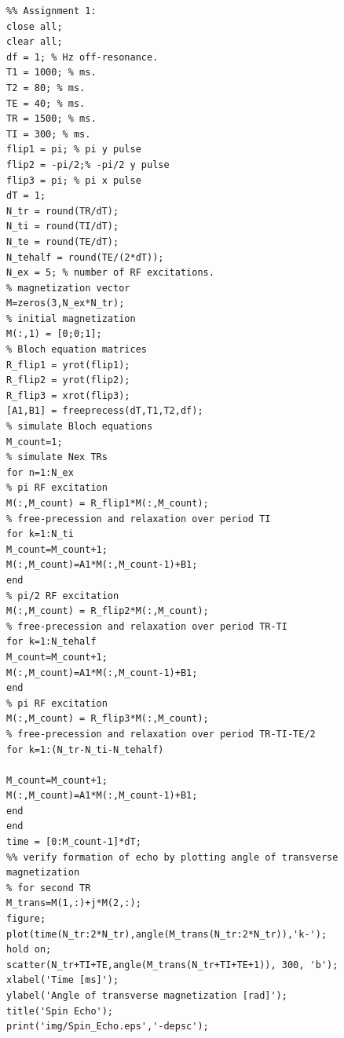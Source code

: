 \begin{lstlisting}
%% Assignment 1:
close all;
clear all;
df = 1; % Hz off-resonance.
T1 = 1000; % ms.
T2 = 80; % ms.
TE = 40; % ms.
TR = 1500; % ms.
TI = 300; % ms.
flip1 = pi; % pi y pulse
flip2 = -pi/2;% -pi/2 y pulse
flip3 = pi; % pi x pulse
dT = 1;
N_tr = round(TR/dT);
N_ti = round(TI/dT);
N_te = round(TE/dT);
N_tehalf = round(TE/(2*dT));
N_ex = 5; % number of RF excitations.
% magnetization vector
M=zeros(3,N_ex*N_tr);
% initial magnetization
M(:,1) = [0;0;1];
% Bloch equation matrices
R_flip1 = yrot(flip1);
R_flip2 = yrot(flip2);
R_flip3 = xrot(flip3);
[A1,B1] = freeprecess(dT,T1,T2,df);
% simulate Bloch equations
M_count=1;
% simulate Nex TRs
for n=1:N_ex
% pi RF excitation
M(:,M_count) = R_flip1*M(:,M_count);
% free-precession and relaxation over period TI
for k=1:N_ti
M_count=M_count+1;
M(:,M_count)=A1*M(:,M_count-1)+B1;
end
% pi/2 RF excitation
M(:,M_count) = R_flip2*M(:,M_count);
% free-precession and relaxation over period TR-TI
for k=1:N_tehalf
M_count=M_count+1;
M(:,M_count)=A1*M(:,M_count-1)+B1;
end
% pi RF excitation
M(:,M_count) = R_flip3*M(:,M_count);
% free-precession and relaxation over period TR-TI-TE/2
for k=1:(N_tr-N_ti-N_tehalf)

M_count=M_count+1;
M(:,M_count)=A1*M(:,M_count-1)+B1;
end
end
time = [0:M_count-1]*dT;
%% verify formation of echo by plotting angle of transverse magnetization
% for second TR
M_trans=M(1,:)+j*M(2,:);
figure;
plot(time(N_tr:2*N_tr),angle(M_trans(N_tr:2*N_tr)),'k-');
hold on;
scatter(N_tr+TI+TE,angle(M_trans(N_tr+TI+TE+1)), 300, 'b');
xlabel('Time [ms]');
ylabel('Angle of transverse magnetization [rad]');
title('Spin Echo');
print('img/Spin_Echo.eps','-depsc');
\end{lstlisting}


